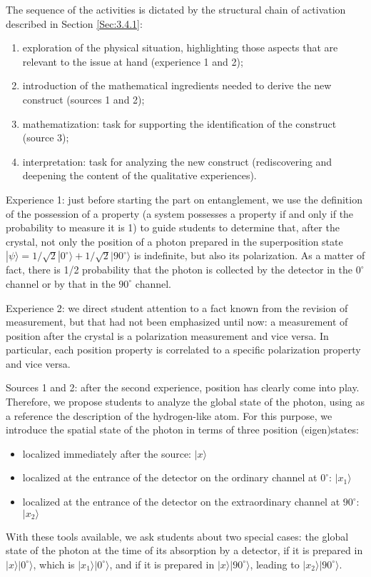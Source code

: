 \documentclass[twocolumn,secnumarabic,amssymb, nobibnotes, aps, prd, nofootinbib]{revtex4-2}
\begin{document}
The sequence of the activities is dictated by the structural chain of activation described in Section \ref{Sec:3.4.1}:
\begin{enumerate}
    \item exploration of the physical situation, highlighting those aspects that are relevant to the issue at hand (experience 1 and 2);
    \item introduction of the mathematical ingredients needed to derive the new construct (sources 1 and 2);
    \item mathematization: task for supporting the identification of the construct (source 3);
    \item interpretation: task for analyzing the new construct (rediscovering and deepening the content of the qualitative experiences).
\end{enumerate}

Experience 1: just before starting the part on entanglement, we use the definition of the possession of a property (a system possesses a property if and only if the probability to measure it is 1) to guide students to determine that, after the crystal, not only the position of a photon prepared in the superposition state $|\psi\rangle=1/\sqrt{2}|0^{\circ}\rangle+1/\sqrt{2}|90^{\circ}\rangle$  is indefinite, but also its polarization. As a matter of fact, there is 1/2 probability that the photon is collected by the detector in the $0^{\circ}$ channel or by that in the $90^{\circ}$ channel.

Experience 2: we direct student attention to a fact known from the revision of measurement, but that had not been emphasized until now: a measurement of position after the crystal is a polarization measurement and vice versa. In particular, each position property is correlated to a specific polarization property and vice versa.

Sources 1 and 2: after the second experience, position has clearly come into play. Therefore, we propose students to analyze the global state of the photon, using as a reference the description of the hydrogen-like atom. For this purpose, we introduce the spatial state of the photon in terms of three position (eigen)states:
\begin{itemize}
    \item localized immediately after the source: $|x\rangle$
    \item localized at the entrance of the detector on the ordinary channel at $0^{\circ}$: $|x_1\rangle$
    \item localized at the entrance of the detector on the extraordinary channel at $90^{\circ}$: $|x_2\rangle$
\end{itemize}
With these tools available, we ask students about two special cases: the global state of the photon at the time of its absorption by a detector, if it is prepared in $|x\rangle|0^{\circ}\rangle$, which is $|x_1\rangle|0^{\circ}\rangle$, and if it is prepared in $|x\rangle|90^{\circ}\rangle$, leading to $|x_2\rangle|90^{\circ}\rangle$.
\end{document}
